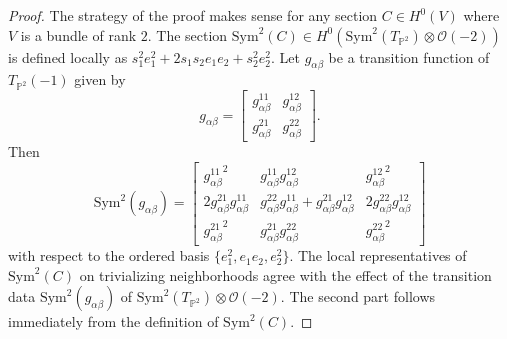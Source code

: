 \documentclass[12pt]{amsart}
\theoremstyle{definition}
\theoremstyle{remark}
\numberwithin{equation}{section}
\begin{document}
\begin{proof}
The strategy of the proof makes sense for any section $C\in H^0(V)$ where $V$ is a bundle of rank $2$. The section $\mbox{Sym}^2(C)\in H^0(\mbox{Sym}^2(T_{\mathbb{P}^2})\otimes\mathcal{O}(-2))$ is defined locally as $s_1^2e_1^2 + 2s_1s_2e_1e_2 + s_2^2e_2^2$. Let $g_{\alpha\beta}$ be a transition function of $T_{\mathbb{P}^2}(-1)$ given by \begin{equation}
   g_{\alpha\beta} = \begin{bmatrix}
        g_{\alpha\beta}^{11} & g_{\alpha\beta}^{12}\\
        g_{\alpha\beta}^{21} & g_{\alpha\beta}^{22}
    \end{bmatrix}. 
\end{equation} Then \begin{equation}
    \mbox{Sym}^2(g_{\alpha\beta}) = \begin{bmatrix}
        {g_{\alpha\beta}^{11}}^2 & g_{\alpha\beta}^{11}g_{\alpha\beta}^{12} & {g_{\alpha\beta}^{12}}^2\\
        2g_{\alpha\beta}^{21}g_{\alpha\beta}^{11} & g_{\alpha\beta}^{22}g_{\alpha\beta}^{11} + g_{\alpha\beta}^{21}g_{\alpha\beta}^{12} & 2g_{\alpha\beta}^{22}g_{\alpha\beta}^{12}\\
        {g_{\alpha\beta}^{21}}^2 & g_{\alpha\beta}^{21}g_{\alpha\beta}^{22} & {g_{\alpha\beta}^{22}}^2
    \end{bmatrix}
\end{equation} with respect to the ordered basis $\{e_1^2, e_1e_2, e_2^2\}$. The local representatives of $\mbox{Sym}^2(C)$ on trivializing neighborhoods agree with the effect of the transition data $\mbox{Sym}^2(g_{\alpha\beta})$ of $\mbox{Sym}^2(T_{\mathbb{P}^2})\otimes\mathcal{O}(-2)$. The second part follows immediately from the definition of $\mbox{Sym}^2(C)$.
\end{proof}
\end{document}
